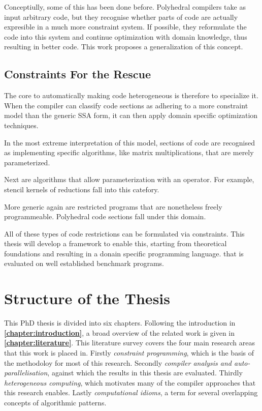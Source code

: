     Conceptiully, some of this has been done before.
    Polyhedral compilers take as input arbitrary code, but they recognise whether
    parts of code are actually expresible in a much more constraint system.
    If possible, they reformulate the code into this system and continue
    optimization with domain knowledge, thus resulting in better code.
    This work proposes a generalization of this concept.

    \subsection{Constraints For the Rescue}
    The core to automatically making code heterogeneous is therefore to specialize it.
    When the compiler can classify code sections as adhering to a more constraint
    model than the generic SSA form, it can then apply domain specific optimization techniques.

    In the most extreme interpretation of this model, sections of code are
    recognised as implementing specific algorithms, like matrix multiplications,
    that are merely parameterized.

    Next are algorithms that allow parameterization with an operator.
    For example, stencil kernels of reductions fall into this catefory.

    More generic again are restricted programs that are nonetheless freely
    programmeable.
    Polyhedral code sections fall under this domain.

    All of these types of code restrictions can be formulated via constraints.
    This thesis will develop a framework to enable this, starting from
    theoretical foundations and resulting in a donain specific programming
    language. that is evaluated on well established benchmark programs.


\pagebreak
\section{Structure of the Thesis}

    This PhD thesis is divided into six chapters.
    Following the introduction in {\bf\cref{chapter:introduction}}, a broad
    overview of the related work is given in {\bf\cref{chapter:literature}}.
    This literature survey covers the four main research areas that this work
    is placed in.
    Firstly {\em constraint programming}, which is the basis of the methodoloy
    for most of this research.
    Secondly {\em compiler analysis and auto-parallelisation}, against which the
    results in this thesis are evaluated.
    Thirdly {\em heterogeneous computing}, which motivates many of the compiler
    approaches that this research enables.
    Lastly {\em computational idioms}, a term for several overlapping concepts
    of algorithmic patterns.

